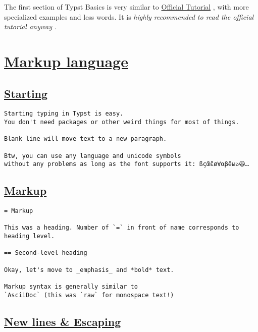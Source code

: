 The first section of Typst Basics is very similar to
\href{https://typst.app/docs/tutorial/}{Official Tutorial} , with more
specialized examples and less words. It is \emph{highly recommended to
read the official tutorial anyway} .

\section{\texorpdfstring{\hyperref[markup-language]{Markup
language}}{Markup language}}\label{markup-language}

\subsection{\texorpdfstring{\hyperref[starting]{Starting}}{Starting}}\label{starting}

\begin{verbatim}
Starting typing in Typst is easy.
You don't need packages or other weird things for most of things.

Blank line will move text to a new paragraph.

Btw, you can use any language and unicode symbols
without any problems as long as the font supports it: ßçœ̃ɛ̃ø∀αβёыა😆…
\end{verbatim}

\pandocbounded{}

\subsection{\texorpdfstring{\hyperref[markup]{Markup}}{Markup}}\label{markup}

\begin{verbatim}
= Markup

This was a heading. Number of `=` in front of name corresponds to heading level.

== Second-level heading

Okay, let's move to _emphasis_ and *bold* text.

Markup syntax is generally similar to
`AsciiDoc` (this was `raw` for monospace text!)
\end{verbatim}

\pandocbounded{}

\subsection{\texorpdfstring{\hyperref[new-lines--escaping]{New lines \&
Escaping}}{New lines \& Escaping}}\label{new-lines--escaping}

